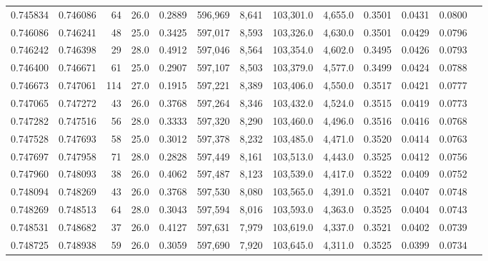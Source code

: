 \begin{tabular}{rrrrrrrrrrrrr}
0.745834 & 0.746086 &    64 & 26.0 &                                     0.2889 & 596,969 &   8,641 & 103,301.0 &   4,655.0 & 0.3501 & 0.0431 & 0.0800 \\
0.746086 & 0.746241 &    48 & 25.0 &                                     0.3425 & 597,017 &   8,593 & 103,326.0 &   4,630.0 & 0.3501 & 0.0429 & 0.0796 \\
0.746242 & 0.746398 &    29 & 28.0 &                                     0.4912 & 597,046 &   8,564 & 103,354.0 &   4,602.0 & 0.3495 & 0.0426 & 0.0793 \\
0.746400 & 0.746671 &    61 & 25.0 &                                     0.2907 & 597,107 &   8,503 & 103,379.0 &   4,577.0 & 0.3499 & 0.0424 & 0.0788 \\
0.746673 & 0.747061 &   114 & 27.0 &                                     0.1915 & 597,221 &   8,389 & 103,406.0 &   4,550.0 & 0.3517 & 0.0421 & 0.0777 \\
0.747065 & 0.747272 &    43 & 26.0 &                                     0.3768 & 597,264 &   8,346 & 103,432.0 &   4,524.0 & 0.3515 & 0.0419 & 0.0773 \\
0.747282 & 0.747516 &    56 & 28.0 &                                     0.3333 & 597,320 &   8,290 & 103,460.0 &   4,496.0 & 0.3516 & 0.0416 & 0.0768 \\
0.747528 & 0.747693 &    58 & 25.0 &                                     0.3012 & 597,378 &   8,232 & 103,485.0 &   4,471.0 & 0.3520 & 0.0414 & 0.0763 \\
0.747697 & 0.747958 &    71 & 28.0 &                                     0.2828 & 597,449 &   8,161 & 103,513.0 &   4,443.0 & 0.3525 & 0.0412 & 0.0756 \\
0.747960 & 0.748093 &    38 & 26.0 &                                     0.4062 & 597,487 &   8,123 & 103,539.0 &   4,417.0 & 0.3522 & 0.0409 & 0.0752 \\
0.748094 & 0.748269 &    43 & 26.0 &                                     0.3768 & 597,530 &   8,080 & 103,565.0 &   4,391.0 & 0.3521 & 0.0407 & 0.0748 \\
0.748269 & 0.748513 &    64 & 28.0 &                                     0.3043 & 597,594 &   8,016 & 103,593.0 &   4,363.0 & 0.3525 & 0.0404 & 0.0743 \\
0.748531 & 0.748682 &    37 & 26.0 &                                     0.4127 & 597,631 &   7,979 & 103,619.0 &   4,337.0 & 0.3521 & 0.0402 & 0.0739 \\
0.748725 & 0.748938 &    59 & 26.0 &                                     0.3059 & 597,690 &   7,920 & 103,645.0 &   4,311.0 & 0.3525 & 0.0399 & 0.0734 \\

\end{tabular}

